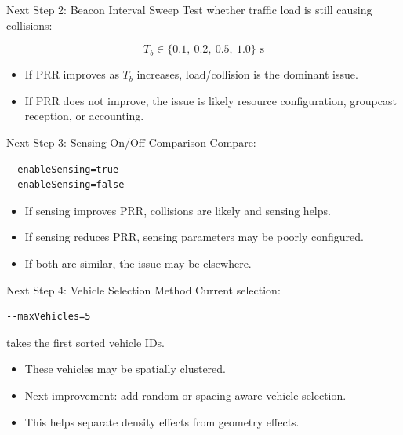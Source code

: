 \documentclass[aspectratio=169,11pt]{beamer}
\begin{document}
\begin{frame}{Next Step 2: Beacon Interval Sweep}
\large
Test whether traffic load is still causing collisions:

\[
T_b \in \{0.1,\ 0.2,\ 0.5,\ 1.0\}\text{ s}
\]

\vspace{0.3cm}
\begin{itemize}
  \item If PRR improves as \(T_b\) increases, load/collision is the dominant issue.
  \item If PRR does not improve, the issue is likely resource configuration, groupcast reception, or accounting.
\end{itemize}
\end{frame}

\begin{frame}[fragile]{Next Step 3: Sensing On/Off Comparison}
\large
Compare:

\begin{lstlisting}
--enableSensing=true
--enableSensing=false
\end{lstlisting}

\vspace{0.25cm}
\begin{itemize}
  \item If sensing improves PRR, collisions are likely and sensing helps.
  \item If sensing reduces PRR, sensing parameters may be poorly configured.
  \item If both are similar, the issue may be elsewhere.
\end{itemize}
\end{frame}

\begin{frame}[fragile]{Next Step 4: Vehicle Selection Method}
\large
Current selection:

\begin{lstlisting}
--maxVehicles=5
\end{lstlisting}

takes the first sorted vehicle IDs.

\vspace{0.25cm}
\begin{itemize}
  \item These vehicles may be spatially clustered.
  \item Next improvement: add random or spacing-aware vehicle selection.
  \item This helps separate density effects from geometry effects.
\end{itemize}
\end{frame}
\end{document}
